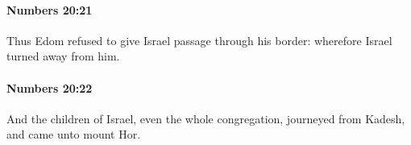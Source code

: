 		\paragraph{Numbers 20:21} %
			\label{NUMBERS-20-21}

			Thus Edom refused to give Israel passage through his border: wherefore Israel turned away from him.


		\paragraph{Numbers 20:22} %
			\label{NUMBERS-20-22}

			And the children of Israel, even the whole congregation, journeyed from Kadesh, and came unto mount Hor.


